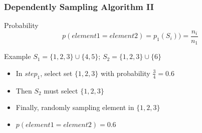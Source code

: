 \documentclass[notheorems, aspectratio=54]{beamer}
\begin{document}
\begin{frame}
    \frametitle{Dependently Sampling Algorithm II}
    \begin{block}{Probability}
        $$
            p(element1 = element2) = p_1(S_i)) = \frac{n_i}{n_1}
        $$
    \end{block}
    \begin{block}{Example}
        $S_1 =  \{1,2,3\} \cup \{4,5\}$; $S_2 = \{1,2,3\} \cup \{6\}$
        \begin{itemize}
            \item In $step_1$, select set $\{1,2,3\}$ with probability $\frac{3}{4} = 0.6$
            \item Then $S_2$ must select $\{1,2,3\}$
            \item Finally, randomly sampling element in $\{1,2,3\}$
            \item $p(element1 = element2) = 0.6$
        \end{itemize}
    \end{block}
\end{frame}

        
\end{document}
